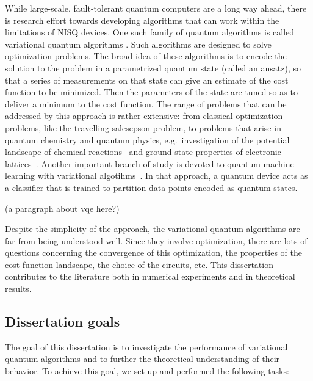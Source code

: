 While large-scale, fault-tolerant quantum computers are a long way ahead, there is research effort towards developing algorithms that can work within the limitations of NISQ devices. One such family of quantum algorithms is called variational quantum algorithms \cite{cerezo_variational_2020}. Such algorithms are designed to solve optimization problems. The broad idea of these algorithms is to encode the solution to the problem in a parametrized quantum state (called an ansatz), so that a series of measurements on that state can give an estimate of the cost function to be minimized. Then the parameters of the state are tuned so as to deliver a minimum to the cost function. The range of problems that can be addressed by this approach is rather extensive: from classical optimization problems, like the travelling salesepson problem, to problems that arise in quantum chemistry and quantum physics, e.g.~investigation of the potential landscape of chemical reactions~\cite{reiher_elucidating_2017} and ground state properties of electronic lattices~\cite{cade_strategies_2019}. Another important branch of study is devoted to quantum machine learning with variational algotihms~\cite{skolik_layerwise_2020,havlicek_supervised_2019,schuld_circuit-centric_2020}. In that approach, a quantum device acts as a classifier that is trained to partition data points encoded as quantum states.

(a paragraph about vqe here?)

Despite the simplicity of the approach, the variational quantum algorithms are far from being understood well. Since they involve optimization, there are lots of questions concerning the convergence of this optimization, the properties of the cost function landscape, the choice of the circuits, etc. This dissertation contributes to the literature both in numerical experiments and in theoretical results.

\subsection*{Dissertation goals} 

The goal of this dissertation is to investigate the performance of variational quantum algorithms and to further the theoretical understanding of their behavior. To achieve this goal, we set up and performed the following tasks:


